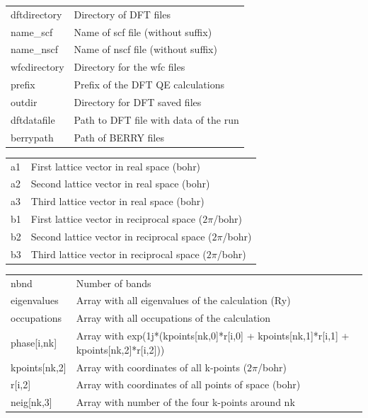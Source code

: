 \documentclass[a4paper,12pt]{report}
\begin{document}
\begin{tabularx}{\textwidth}{Xl}
 dftdirectory   & Directory of DFT files \\
 name\_scf       & Name of scf file (without suffix) \\
 name\_nscf      & Name of nscf file (without suffix) \\
 wfcdirectory   & Directory for the wfc files \\
 prefix         & Prefix of the DFT QE calculations \\
 outdir         & Directory for DFT saved files \\
 dftdatafile    & Path to DFT file with data of the run \\
 berrypath      & Path of BERRY files \\
\end{tabularx}
\vspace{0.5cm}

\begin{tabularx}{\textwidth}{Xl}
 a1             & First lattice vector in real space (bohr) \\
 a2             & Second lattice vector in real space (bohr) \\
 a3             & Third lattice vector in real space (bohr) \\

 b1             & First lattice vector in reciprocal space ($2\pi$/bohr) \\
 b2             & Second lattice vector in reciprocal space ($2\pi$/bohr) \\
 b3             & Third lattice vector in reciprocal space ($2\pi$/bohr) \\
\end{tabularx}
\vspace{0.5cm}

\hspace*{-2cm}\begin{tabularx}{\textwidth}{ll}
 nbnd           & Number of bands \\

 eigenvalues    & Array with all eigenvalues of the calculation (Ry) \\
 occupations    & Array with all occupations of the calculation \\

 phase[i,nk]    & Array with exp(1j*(kpoints[nk,0]*r[i,0] + kpoints[nk,1]*r[i,1] + kpoints[nk,2]*r[i,2])) \\
 kpoints[nk,2]  & Array with coordinates of all k-points ($2\pi$/bohr) \\
 r[i,2]         & Array with coordinates of all points of space (bohr) \\

 neig[nk,3]     & Array with number of the four k-points around nk \\
\end{tabularx}
\end{document}
